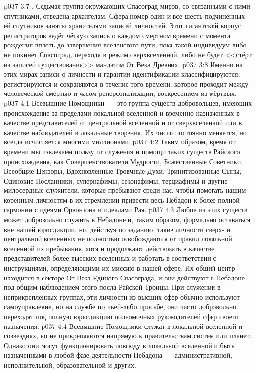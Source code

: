 \vs p037 3:7 \pc {}. Седьмая группа окружающих Спасоград миров, со связанными с ними спутниками, отведена архангелам. Сфера номер один и все шесть подчинённых ей спутников заняты хранителями записей личностей. Этот гигантский корпус регистраторов ведёт чёткую запись о каждом смертном времени с момента рождения вплоть до завершения вселенского пути, пока такой индивидуум либо не покинет Спасоград, переходя в режим сверхвселенной, либо не будет <<стёрт из записей существования>> мандатом От Века Древних.
\vs p037 3:8 Именно на этих мирах записи о личности и гарантии идентификации классифицируются, регистрируются и сохраняются в течение того времени, которое проходит между человеческой смертью и часом реперсонализации, воскресением из мёртвых.
\vs p037 4:1 Всевышние Помощники~--- это группа существ\hyp{}добровольцев, имеющих происхождение за пределами локальной вселенной и временно назначенных в качестве представителей от центральной вселенной и от сверхвселенной или в качестве наблюдателей в локальные творения. Их число постоянно меняется, но всегда исчисляется многими миллионами.
\vs p037 4:2 Таким образом, время от времени мы извлекаем пользу от служения и помощи таких существ Райского происхождения, как Совершенствователи Мудрости, Божественные Советники, Всеобщие Цензоры, Вдохновлённые Троичные Духи, Тринитизованные Сыны, Одинокие Посланники, супернафимы, секонафимы, терциафимы и другие милосердные служители, которые пребывают среди нас, чтобы помогать нашим коренным личностям в их стремлении привести весь Небадон к более полной гармонии с идеями Орвонтона и идеалами Рая.
\vs p037 4:3 Любое из этих существ может добровольно служить в Небадоне и, таким образом, формально оставаться вне нашей юрисдикции, но, действуя по заданию, такие личности сверх- и центральной вселенных не полностью освобождаются от правил локальной вселенной их пребывания, хотя и продолжают действовать в качестве представителей более высоких вселенных и работать в соответствии с инструкциями, определяющими их миссию в нашей сфере. Их общий центр находится в секторе От Века Единого Спасограда, и они действуют в Небадоне под общим наблюдением этого посла Райской Троицы. При служении в неприкреплённых группах, эти личности из высших сфер обычно используют самоуправление, но на службе по чьей\hyp{}либо просьбе, они часто добровольно переходят под полную юрисдикцию полномочных руководителей сфер своего назначения.
\vs p037 4:4 Всевышние Помощники служат в локальной вселенной и созвездиях, но не прикрепляются напрямую к правительствам систем или планет. Однако они могут функционировать повсюду в локальной вселенной и быть назначенными в любой фазе деятельности Небадона~--- административной, исполнительной, образовательной и других.
